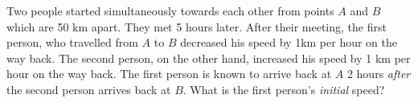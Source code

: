 
%
%
%
%
% 
% 

\question[5] Two people started simultaneously towards each other from points $A$ and $B$ which 
are 50 km apart. They met 5 hours later. After their meeting, the first person, who travelled 
from $A$ to $B$ decreased his speed by 1km per hour on the way back. The second person, 
on the other hand, increased his speed by 1 km per hour on the way back. The first person 
is known to arrive back at $A$ 2 hours \textit{after} the second person arrives back at $B$. What is 
the first person's \textit{initial} speed?


\ifprintanswers
\fi 

